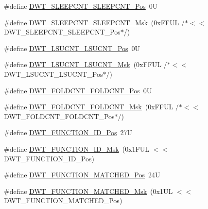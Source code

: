 \begin{DoxyCompactItemize}
\#define \mbox{\hyperlink{group___c_m_s_i_s___d_w_t_ga0371a84a7996dc5852c56afb2676ba1c}{D\+W\+T\+\_\+\+S\+L\+E\+E\+P\+C\+N\+T\+\_\+\+S\+L\+E\+E\+P\+C\+N\+T\+\_\+\+Pos}}~0U
\item 
\#define \mbox{\hyperlink{group___c_m_s_i_s___d_w_t_ga1e340751d71413fef400a0a1d76cc828}{D\+W\+T\+\_\+\+S\+L\+E\+E\+P\+C\+N\+T\+\_\+\+S\+L\+E\+E\+P\+C\+N\+T\+\_\+\+Msk}}~(0x\+F\+F\+U\+L /$\ast$$<$$<$ D\+W\+T\+\_\+\+S\+L\+E\+E\+P\+C\+N\+T\+\_\+\+S\+L\+E\+E\+P\+C\+N\+T\+\_\+\+Pos$\ast$/)
\item 
\#define \mbox{\hyperlink{group___c_m_s_i_s___d_w_t_gab9394c7911b0b4312a096dad91d53a3d}{D\+W\+T\+\_\+\+L\+S\+U\+C\+N\+T\+\_\+\+L\+S\+U\+C\+N\+T\+\_\+\+Pos}}~0U
\item 
\#define \mbox{\hyperlink{group___c_m_s_i_s___d_w_t_ga2186d7fc9317e20bad61336ee2925615}{D\+W\+T\+\_\+\+L\+S\+U\+C\+N\+T\+\_\+\+L\+S\+U\+C\+N\+T\+\_\+\+Msk}}~(0x\+F\+F\+U\+L /$\ast$$<$$<$ D\+W\+T\+\_\+\+L\+S\+U\+C\+N\+T\+\_\+\+L\+S\+U\+C\+N\+T\+\_\+\+Pos$\ast$/)
\item 
\#define \mbox{\hyperlink{group___c_m_s_i_s___d_w_t_ga7f8af5ac12d178ba31a516f6ed141455}{D\+W\+T\+\_\+\+F\+O\+L\+D\+C\+N\+T\+\_\+\+F\+O\+L\+D\+C\+N\+T\+\_\+\+Pos}}~0U
\item 
\#define \mbox{\hyperlink{group___c_m_s_i_s___d_w_t_ga9cb73d0342d38b14e41027d3c5c02647}{D\+W\+T\+\_\+\+F\+O\+L\+D\+C\+N\+T\+\_\+\+F\+O\+L\+D\+C\+N\+T\+\_\+\+Msk}}~(0x\+F\+F\+U\+L /$\ast$$<$$<$ D\+W\+T\+\_\+\+F\+O\+L\+D\+C\+N\+T\+\_\+\+F\+O\+L\+D\+C\+N\+T\+\_\+\+Pos$\ast$/)
\item 
\#define \mbox{\hyperlink{group___c_m_s_i_s___d_w_t_gae5dfe4049c2291e413f8713d7bd2bb1b}{D\+W\+T\+\_\+\+F\+U\+N\+C\+T\+I\+O\+N\+\_\+\+I\+D\+\_\+\+Pos}}~27U
\item 
\#define \mbox{\hyperlink{group___c_m_s_i_s___d_w_t_ga6bc2e15fcc300f511f64dad561c97582}{D\+W\+T\+\_\+\+F\+U\+N\+C\+T\+I\+O\+N\+\_\+\+I\+D\+\_\+\+Msk}}~(0x1\+F\+U\+L $<$$<$ D\+W\+T\+\_\+\+F\+U\+N\+C\+T\+I\+O\+N\+\_\+\+I\+D\+\_\+\+Pos)
\item 
\#define \mbox{\hyperlink{group___c_m_s_i_s___d_w_t_ga22c5787493f74a6bacf6ffb103a190ba}{D\+W\+T\+\_\+\+F\+U\+N\+C\+T\+I\+O\+N\+\_\+\+M\+A\+T\+C\+H\+E\+D\+\_\+\+Pos}}~24U
\item 
\#define \mbox{\hyperlink{group___c_m_s_i_s___d_w_t_gac8b1a655947490280709037808eec8ac}{D\+W\+T\+\_\+\+F\+U\+N\+C\+T\+I\+O\+N\+\_\+\+M\+A\+T\+C\+H\+E\+D\+\_\+\+Msk}}~(0x1\+U\+L $<$$<$ D\+W\+T\+\_\+\+F\+U\+N\+C\+T\+I\+O\+N\+\_\+\+M\+A\+T\+C\+H\+E\+D\+\_\+\+Pos)
\item 

\end{DoxyCompactItemize}
